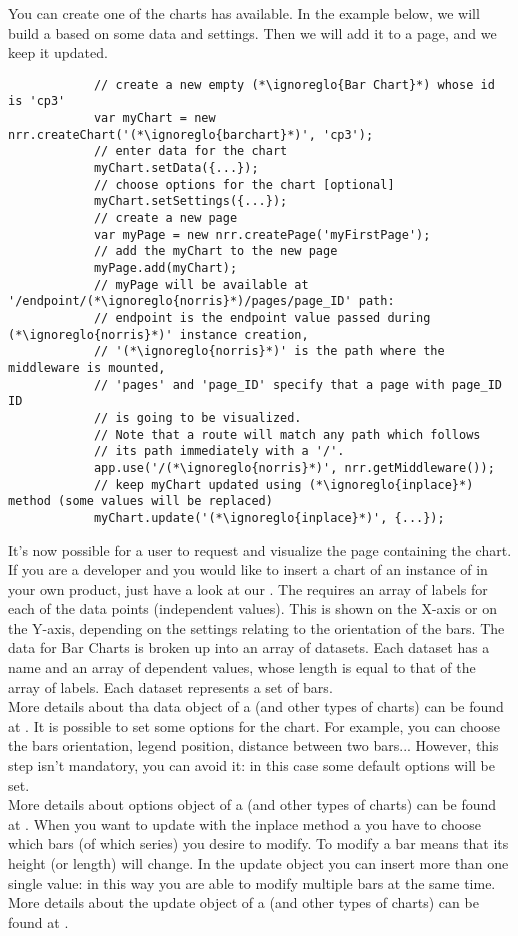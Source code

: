 		You can create one of the charts  has available. In the example below, we will build a  based on some data and settings. Then we will add it to a page, and we keep it updated.
		\begin{lstlisting}
			// create a new empty (*\ignoreglo{Bar Chart}*) whose id is 'cp3'
			var myChart = new nrr.createChart('(*\ignoreglo{barchart}*)', 'cp3');
			// enter data for the chart
			myChart.setData({...});
			// choose options for the chart [optional]
			myChart.setSettings({...});
			// create a new page
			var myPage = new nrr.createPage('myFirstPage');
			// add the myChart to the new page
			myPage.add(myChart);
			// myPage will be available at '/endpoint/(*\ignoreglo{norris}*)/pages/page_ID' path:
			// endpoint is the endpoint value passed during (*\ignoreglo{norris}*)' instance creation,
			// '(*\ignoreglo{norris}*)' is the path where the middleware is mounted, 
			// 'pages' and 'page_ID' specify that a page with page_ID ID 
			// is going to be visualized. 
			// Note that a route will match any path which follows 
			// its path immediately with a '/'.
			app.use('/(*\ignoreglo{norris}*)', nrr.getMiddleware());
			// keep myChart updated using (*\ignoreglo{inplace}*) method (some values will be replaced)
			myChart.update('(*\ignoreglo{inplace}*)', {...});
		\end{lstlisting}
		It's now possible for a user to request and visualize the page containing the chart.\\
		If you are a developer and you would like to insert a chart of an instance of  in your own product, just have a look at our .
			The  requires an array of labels for each of the data points (independent values). This is shown on the X-axis or on the Y-axis, depending on the settings relating to the orientation of the bars. The data for Bar Charts is broken up into an array of datasets. Each dataset has a name and an array of dependent values, whose length is equal to that of the array of labels. Each dataset represents a set of bars.\\
			More details about tha data object of a  (and other types of charts) can be found at .
			It is possible to set some options for the chart. For example, you can choose the bars orientation, legend position, distance between two bars... However, this step isn't mandatory, you can avoid it: in this case some default options will be set.\\
			More details about options object of a  (and other types of charts) can be found at .
			When you want to update with the inplace method a  you have to choose which bars (of which series) you desire to modify. To modify a bar means that its height (or length) will change. In the update object you can insert more than one single value: in this way you are able to modify multiple bars at the same time.\\
			More details about the update object of a  (and other types of charts) can be found at .

